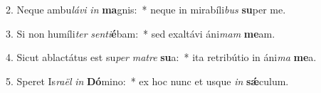 2. Neque ambu\textit{lá}\textit{vi} \textit{in} \textbf{ma}gnis:~*  neque in mirabíli\textit{bus} \textbf{su}per me.\

3. Si non humíli\textit{ter} \textit{sen}\textit{ti}\textbf{é}bam:~*  sed exaltávi áni\textit{mam} \textbf{me}am.\

4. Sicut ablactátus est su\textit{per} \textit{ma}\textit{tre} \textbf{su}a:~*  ita retribútio in áni\textit{ma} \textbf{me}a.\

5. Speret Is\textit{ra}\textit{ël} \textit{in} \textbf{Dó}mino:~*  ex hoc nunc et usque \textit{in} \textbf{sǽ}culum.\

